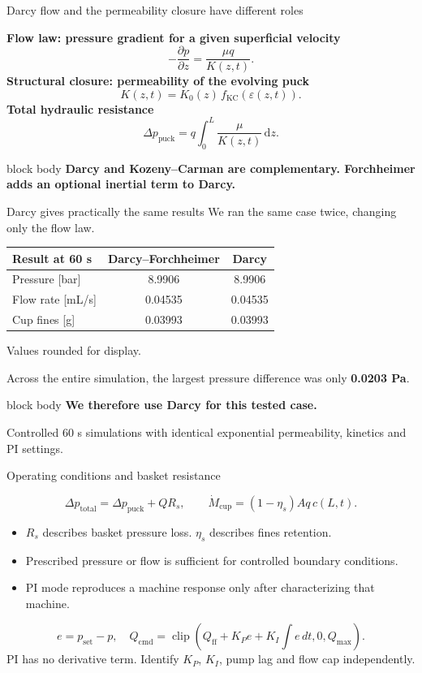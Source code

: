 \documentclass[aspectratio=169,11pt]{beamer}
\newcommand{\hi}[1]{\textcolor{tumblue}{\textbf{#1}}}
\newcommand{\takeaway}[1]{%
  \begin{beamercolorbox}[rounded=true,sep=.55em]{block body}
    \centering\color{tumdark}\textbf{#1}
  \end{beamercolorbox}}
\newcommand{\slidesource}[1]{\par\vfill{\tiny\color{tumgray}#1}}
\begin{document}
\begin{frame}{Darcy flow and the permeability closure have different roles}
\small

\hi{Flow law: pressure gradient for a given superficial velocity}
\[
-\frac{\partial p}{\partial z}=\frac{\mu q}{K(z,t)}.
\]
\hi{Structural closure: permeability of the evolving puck}
\[
K(z,t)=K_0(z)\,f_{\mathrm{KC}}\!\left(\varepsilon(z,t)\right).
\]
\hi{Total hydraulic resistance}
\[
\Delta p_{\mathrm{puck}}=q\int_0^L\frac{\mu}{K(z,t)}\,\mathrm dz.
\]
\takeaway{Darcy and Kozeny--Carman are complementary. Forchheimer adds an optional inertial term to Darcy.}

\end{frame}

\begin{frame}{Darcy gives practically the same results}
\small
We ran the same case twice, changing only the flow law.
\par\medskip
\begin{center}
\begin{tabular}{lcc}
\toprule
\textbf{Result at 60 s} & \textbf{Darcy--Forchheimer} & \textbf{Darcy}\\\midrule
Pressure [bar] & 8.9906 & 8.9906\\[.8em]
Flow rate [mL/s] & 0.04535 & 0.04535\\[.8em]
Cup fines [g] & 0.03993 & 0.03993\\\bottomrule
\end{tabular}
\par\medskip
{\footnotesize Values rounded for display.}
\end{center}
\medskip
Across the entire simulation, the largest pressure difference was only \textbf{0.0203 Pa}.
\vfill\takeaway{We therefore use Darcy for this tested case.}
\slidesource{Controlled 60 s simulations with identical exponential permeability, kinetics and PI settings.}
\end{frame}

\begin{frame}{Operating conditions and basket resistance}
\small

\[
\Delta p_{\mathrm{total}}=\Delta p_{\mathrm{puck}}+Q R_s,\qquad
\dot M_{\mathrm{cup}}=(1-\eta_s)Aq\,c(L,t).
\]
\begin{itemize}
\item $R_s$ describes basket pressure loss. $\eta_s$ describes fines retention.
\item Prescribed pressure or flow is sufficient for controlled boundary conditions.
\item PI mode reproduces a machine response only after characterizing that machine.
\end{itemize}
\[
 e=p_{\mathrm{set}}-p,\quad
 Q_{\mathrm{cmd}}=\operatorname{clip}\left(Q_{\mathrm{ff}}+K_Pe+K_I\int e\,dt,0,Q_{\max}\right).
\]
\small PI has no derivative term. Identify $K_P$, $K_I$, pump lag and flow cap independently.

\end{frame}
\end{document}
